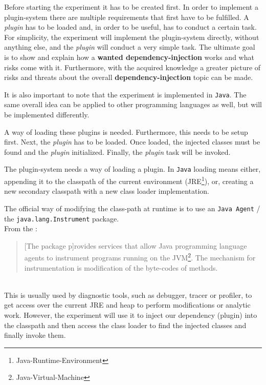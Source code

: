 Before starting the experiment it has to be created first.
In order to implement a plugin-system there are multiple requirements that first have to be fulfilled.
A \textit{plugin} has to be loaded and, in order to be useful, has to conduct a certain task.
For simplicity, the experiment will implement the plugin-system directly, without anything else, and the \textit{plugin} will conduct a very simple task.
The ultimate goal is to show and explain how a \textbf{wanted dependency-injection} works and what risks come with it.
Furthermore, with the acquired knowledge a greater picture of risks and threats about the overall \textbf{dependency-injection} topic can be made.

It is also important to note that the experiment is implemented in \texttt{Java}.
The same overall idea can be applied to other programming languages as well, but will be implemented differently.

A way of loading these plugins is needed.
Furthermore, this needs to be setup first.
Next, the \textit{plugin} has to be loaded.
Once loaded, the injected classes must be found and the \textit{plugin} initialized.
Finally, the \textit{plugin} task will be invoked.

The plugin-system needs a way of loading a plugin.
In \texttt{Java} loading means either, appending it to the classpath of the current environment (JRE\footnote{Java-Runtime-Environment}), or, creating a new secondary classpath with a new class loader implementation.

The official way of modifying the class-path at runtime is to use an \texttt{Java Agent} / the \texttt{java.lang.Instrument} package. \\
From the \textcite{javadoc:instrument}:
\begin{quote}
    [The package p]rovides services that allow Java programming language agents to instrument programs running on the JVM\footnote{Java-Virtual-Machine}.\newline
    The mechanism for instrumentation is modification of the byte-codes of methods.
\end{quote}~\parencite{javadoc:instrument}\\
This is usually used by diagnostic tools, such as debugger, tracer or profiler, to get access over the current JRE and heap to perform modifications or analytic work.
However, the experiment will use it to inject our dependency (plugin) into the classpath and then access the class loader to find the injected classes and finally invoke them.

